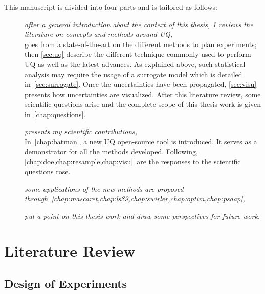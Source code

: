 This manuscript is divided into four parts and is tailored as follows: 

\begin{description}
	\item[] \emph{after a general introduction about the context of this thesis,  \cref{chap:review} reviews the literature on concepts and methods around UQ,}\hfill\\
 goes from a state-of-the-art on the different methods to plan experiments; then \cref{sec:uq} describe the different technique commonly used to perform UQ as well as the latest advances. As explained above, such statistical analysis may require the usage of a surrogate model which is detailed in~\cref{sec:surrogate}. Once the uncertainties have been propagated, \cref{sec:visu} presents how uncertainties are visualized. After this literature review, some scientific questions arise and the complete scope of this thesis work is given in~\cref{chap:questions}.

	\item[] \emph{presents my scientific contributions,}\hfill\\
In~\cref{chap:batman}, a new UQ open-source tool is introduced. It serves as a demonstrator for all the methods developed. Following, \cref{chap:doe,chap:resample,chap:visu}~are the responses to the scientific questions rose.

	\item[] \emph{some applications of the new methods are proposed through~\cref{chap:mascaret,chap:ls89,chap:swirler,chap:optim,chap:psaap},}\hfill\\

	\item[] \emph{put a point on this thesis work and draw some perspectives for future work.}
\end{description}


\chapter{Literature Review}\label{chap:review}

\section{Design of Experiments}\label{sec:doe}

